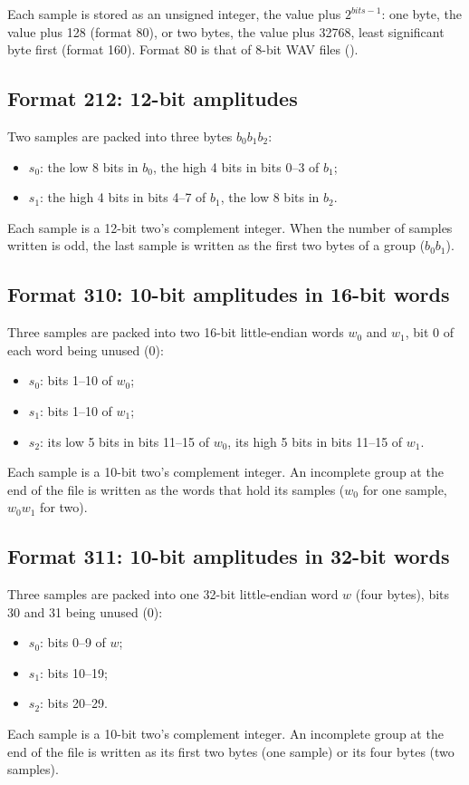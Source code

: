 Each sample is stored as an unsigned integer, the value plus $2^{\mathit{bits}-1}$: one byte,
the value plus 128 (format 80), or two bytes, the value plus 32768, least significant byte
first (format 160). Format 80 is that of 8-bit WAV files ().

\subsection{Format 212: 12-bit amplitudes}
\label{sec:formats-212}

Two samples are packed into three bytes $b_0 b_1 b_2$:
\begin{itemize}
\item $s_0$: the low 8 bits in $b_0$, the high 4 bits in bits 0--3 of $b_1$;
\item $s_1$: the high 4 bits in bits 4--7 of $b_1$, the low 8 bits in $b_2$.
\end{itemize}
Each sample is a 12-bit two's complement integer. When the number of samples written is
odd, the last sample is written as the first two bytes of a group ($b_0 b_1$).

\subsection{Format 310: 10-bit amplitudes in 16-bit words}
\label{sec:formats-310}

Three samples are packed into two 16-bit little-endian words $w_0$ and $w_1$, bit 0 of each
word being unused (0):
\begin{itemize}
\item $s_0$: bits 1--10 of $w_0$;
\item $s_1$: bits 1--10 of $w_1$;
\item $s_2$: its low 5 bits in bits 11--15 of $w_0$, its high 5 bits in bits 11--15 of
  $w_1$.
\end{itemize}
Each sample is a 10-bit two's complement integer. An incomplete group at the end of the
file is written as the words that hold its samples ($w_0$ for one sample, $w_0 w_1$ for
two).

\subsection{Format 311: 10-bit amplitudes in 32-bit words}
\label{sec:formats-311}

Three samples are packed into one 32-bit little-endian word $w$ (four bytes), bits 30 and
31 being unused (0):
\begin{itemize}
\item $s_0$: bits 0--9 of $w$;
\item $s_1$: bits 10--19;
\item $s_2$: bits 20--29.
\end{itemize}
Each sample is a 10-bit two's complement integer. An incomplete group at the end of the
file is written as its first two bytes (one sample) or its four bytes (two samples).

